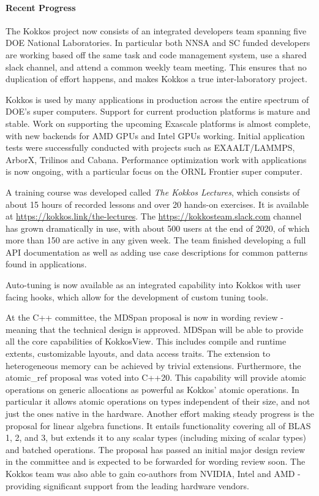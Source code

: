 \paragraph{Recent Progress}

The Kokkos project now consists of an integrated developers team spanning five DOE National Laboratories.
In particular both NNSA and SC funded developers are working based off the same task and code management system, use a shared slack channel, and attend a common weekly team meeting.
This ensures that no duplication of effort happens, and makes Kokkos a true inter-laboratory project.

Kokkos is used by many applications in production across the entire spectrum of DOE's super computers.
Support for current production platforms is mature and stable.
Work on supporting the upcoming Exascale platforms is almost complete, with new backends for AMD GPUs and Intel GPUs working. 
Initial application tests were successfully conducted with projects such as EXAALT/LAMMPS, ArborX, Trilinos and Cabana.
Performance optimization work with applications is now ongoing, with a particular focus on the ORNL Frontier super computer.

A training course was developed called \textit{The Kokkos Lectures}, which consists of about 15 hours of recorded lessons and over 20 hands-on exercises.
It is available at \url{https://kokkos.link/the-lectures}.
The \url{https://kokkosteam.slack.com} channel has grown dramatically in use, with about 500 users at the end of 2020, of which more than 150 are active in any given week.
The team finished developing a full API documentation as well as adding use case descriptions for common patterns found in applications.

Auto-tuning is now available as an integrated capability into Kokkos with user facing hooks, which allow for the development of custom tuning tools.

At the C++ committee, the MDSpan proposal is now in wording review - meaning that the technical design is approved. 
MDSpan will be able to provide all the core capabilities of Kokkos\:\:View.
This includes compile and runtime extents, customizable layouts, and data access traits.
The extension to heterogeneous memory can be achieved by trivial extensions.
Furthermore, the atomic\_ref proposal was voted into C++20.
This capability will provide atomic operations on generic allocations as powerful as Kokkos' atomic operations.
In particular it allows atomic operations on types independent of their size, and not just the ones native in the hardware.
Another effort making steady progress is the proposal for linear algebra functions.
It entails functionality covering all of BLAS 1, 2, and 3, but extends it to any scalar types (including mixing of scalar types) and batched operations.
The proposal has passed an initial major design review in the committee and is expected to be forwarded for wording review soon.
The Kokkos team was also able to gain co-authors from NVIDIA, Intel and AMD - providing significant support from the leading hardware vendors.

